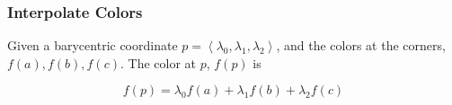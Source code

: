   \subsubsection{Interpolate Colors}

    Given a barycentric coordinate
    $ p = \left< \lambda_{0}, \lambda_{1}, \lambda_{2} \right> $, and the
    colors at the corners,
    $ f\left( a \right), f\left( b \right), f\left( c \right) $. The color
    at $ p $, $ f\left( p \right) $ is

    \begin{equation}
      f\left( p \right)
        = \lambda_{0} f\left( a \right)
        + \lambda_{1} f\left( b \right)
        + \lambda_{2} f\left( c \right)
    \end{equation}
